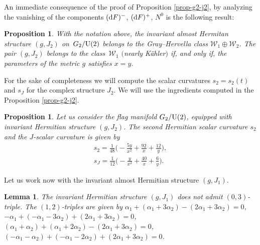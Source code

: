 \documentclass[10pt,a4paper]{amsart}
\numberwithin{equation}{section}
\newtheorem{Lemma}[Theorem]{Lemma}
\newtheorem{Proposition}[Theorem]{Proposition}
 { \theoremstyle{definition}
\newtheorem{Definition}[Theorem]{Definition}
\newtheorem{Question}[Theorem]{Question}
\newtheorem*{Notation}{Notation}
\newtheorem{Example}[Theorem]{Example}
\newtheorem{Remark}[Theorem]{Remark} }
\begin{document}
An immediate consequence of the proof of Proposition \ref{prop-g2-j2}, by analyzing the vanishing of the components $({\rm d}F)^{-}$, $({\rm d}F)^{+}$, $N^0$ is the following result:
\begin{Proposition}
With the notation above, the invariant almost Hermitan structure $(g, J_{2})$ on~$G_{2}/{\rm U}(2)$ belongs to the Gray--Hervella class $\mathcal{W}_{1}\oplus \mathcal{W}_{2}$. The pair $(g, J_{2})$ belongs to the class~$\mathcal{W}_{1}$ $($nearly K\"ahler$)$ if, and only if, the parameters of the metric $g$ satisfies $x=y$.
\end{Proposition}

For the sake of completeness we will compute the scalar curvatures $s_{2}=s_2(t)$ and $s_J$ for the complex structure $J_2$. We will use the ingredients computed in the Proposition \ref{prop-g2-j2}.

\begin{Proposition}
Let us consider the flag manifold $G_2/{\rm U}(2)$, equipped with invariant Hermitian structure $(g, J_{2})$. The second Hermitian scalar curvature $s_2$ and the $J$-scalar curvature is given by
\begin{gather*}
s_{2}=\frac{1}{48} \bigg({-}\frac{5 y}{x^2}+\frac{92}{x}+\frac{12}{y}\bigg),
\\
s_{J}=\frac{1}{12} \bigg({-}\frac{y}{x^2}+\frac{40}{x}+\frac{6}{y}\bigg).
\end{gather*}
\end{Proposition}

Let us work now with the invariant almost Hermitian structure $(g, J_{1})$.

\begin{Lemma}
The invariant Hermitian structure $(g, J_{1})$ does not admit $(0,3)$-triple. The $(1,2)$-triples are given by $\alpha_1+( \alpha_1+3\alpha_2) - ( 2\alpha_1+3\alpha_2)=0$, $-\alpha_1 + ( -\alpha_1-3\alpha_2)+(2\alpha_1+3\alpha_2)=0$, $(\alpha_1+\alpha_2) + ( \alpha_1+2\alpha_2)-(2\alpha_1+3\alpha_2)=0$, $( -\alpha_1-\alpha_2)+ ( -\alpha_1-2\alpha_2)+(2\alpha_1+3\alpha_2)=0$.
\end{Lemma}
\end{document}
